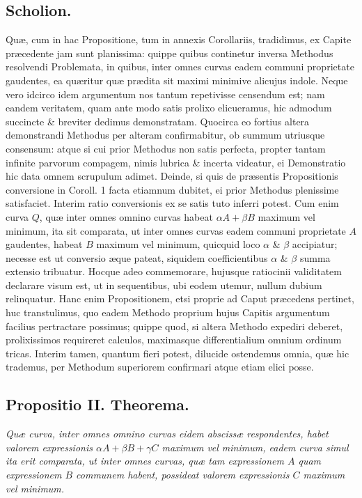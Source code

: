 \subsection*{Scholion.}
Quæ, cum in hac Propositione, tum in annexis Corollariis, tradidimus, ex Capite præcedente jam sunt planissima: quippe quibus continetur inversa Methodus resolvendi Problemata, in quibus, inter omnes curvas eadem communi proprietate gaudentes, ea quæritur quæ prædita sit maximi minimive alicujus indole. Neque vero idcirco idem argumentum nos tantum repetivisse censendum est; nam eandem veritatem, quam ante modo satis prolixo elicueramus, hic admodum succincte \& breviter dedimus demonstratam. Quocirca eo fortius altera demonstrandi Methodus per alteram confirmabitur, ob summum utriusque consensum: atque si cui prior Methodus non satis perfecta, propter tantam infinite parvorum compagem, nimis lubrica \& incerta videatur, ei Demonstratio hic data omnem
 scrupulum adimet. Deinde, si quis de præsentis Propositionis conversione in Coroll. 1 facta etiamnum dubitet, ei prior Methodus plenissime satisfaciet. Interim ratio conversionis ex se satis tuto inferri potest. Cum enim curva $Q$, quæ inter omnes omnino curvas habeat $\alpha A+\beta B$ maximum vel minimum, ita sit comparata, ut inter omnes curvas eadem communi proprietate $A$ gaudentes, habeat $B$ maximum vel minimum, quicquid loco $\alpha$ \& $\beta$ accipiatur; necesse est ut conversio æque pateat, siquidem coefficientibus $\alpha$ \& $\beta$ summa extensio tribuatur. Hocque adeo commemorare, hujusque ratiocinii validitatem declarare visum est, ut in sequentibus, ubi eodem utemur, nullum dubium relinquatur. Hanc enim Propositionem, etsi proprie ad Caput præcedens pertinet, huc transtulimus, quo eadem Methodo proprium hujus Capitis argumentum facilius pertractare possimus; quippe quod, si altera Methodo expediri deberet, prolixissimos requireret calculos, maximasque differentialium omnium ordinum tricas. Interim tamen, quantum fieri potest, dilucide ostendemus omnia, quæ hic trademus, per Methodum superiorem confirmari atque etiam elici posse.
\subsection*{Propositio II. Theorema.}
\textit{Quæ curva, inter omnes omnino curvas eidem abscissæ respondentes, habet valorem expressionis $\alpha A+\beta B+\gamma C$ maximum vel minimum, eadem curva simul ita erit comparata, ut inter omnes curvas, quæ tam expressionem $A$ quam expressionem $B$ communem habent, possideat valorem expressionis $C$ maximum vel minimum.}
